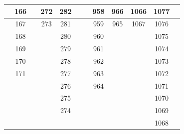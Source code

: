 \begin{center}
{\begin{tabular} {| c | c | c | c | c | c | c | c | c | c | c | c | }
                         & 166                      &      & 272 & 282                      &                          &     & 958                      &  966                      & 1066 & 1077                       &                           \\ \hline
                         & 167                      &      & 273 & 281                      &                          &     & 959                      &  965                      & 1067 & 1076                       &                           \\ \hline
                         & 168                      &      &     & 280                      &                          &     & 960                      &                           &      & 1075                       &                           \\ \hline
                         & 169                      &      &     & 279                      &                          &     & 961                      &                           &      & 1074                       &                           \\ \hline
                         & 170                      &      &     & 278                      &                          &     & 962                      &                           &      & 1073                       &                           \\ \hline
                         & 171                      &      &     & 277                      &                          &     & 963                      &                           &      & 1072                       &                           \\ \hline
						 &                          &      &     & 276                      &                          &     & 964                      &                           &      & 1071                       &                           \\ \hline
						 &                          &      &     & 275                      &                          &     &                          &                           &      & 1070                       &                           \\ \hline
            			 &                          &      &     & 274                      &                          &     &                          &                           &      & 1069                       &                           \\ \hline
						 &                          &      &     &                          &                          &     &                          &                           &      & 1068                       &                           \\ \hline
 
            



\end{tabular}%
}
\end{center}
